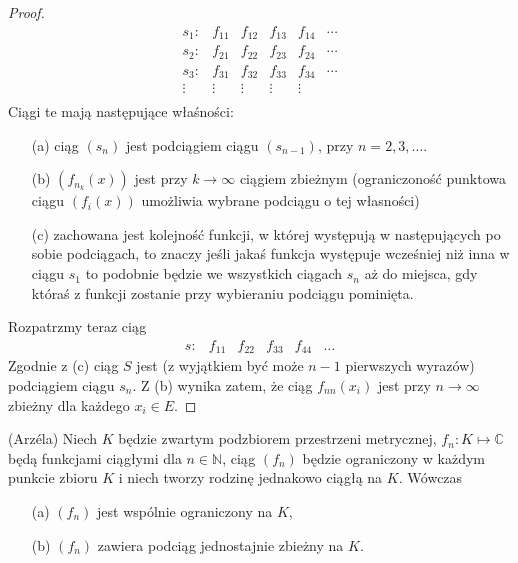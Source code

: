 \documentclass[leqno]{article}
\begin{document}
\begin{justify}
\begin{proof}
    \[
        \begin{array}{cccccc}
        s_1 : &f_{11} & f_{12} & f_{13} & f_{14} & \cdots \\
        s_2 : &f_{21} & f_{22} & f_{23} & f_{24} & \cdots \\
        s_3 : &f_{31} & f_{32} & f_{33} & f_{34} & \cdots \\
        \vdots & \vdots & \vdots & \vdots & \vdots & \\
        \end{array}
    \]
    Ciągi te mają następujące właśności:
    \begin{itemize}
        \item [(a)]
            ciąg $(s_n)$ jest podciągiem ciągu $(s_{n-1})$, przy $n = 2, 3, \ldots$.
        \item [(b)]
            $(f_{n_k}(x))$ jest przy $k \to \infty$ ciągiem zbieżnym (ograniczoność punktowa ciągu $(f_i(x))$ umożliwia wybrane podciągu o tej własności)
        \item [(c)]
            zachowana jest kolejność funkcji, w której występują w następujących po sobie podciągach, to znaczy jeśli jakaś funkcja występuje wcześniej niż inna w ciągu $s_1$
            to podobnie będzie we wszystkich ciągach $s_n$ aż do miejsca, gdy któraś z funkcji zostanie przy wybieraniu podciągu pominięta.
    \end{itemize}
    Rozpatrzmy teraz ciąg 
    \[
        \begin{array}{cccccc}
        s : &f_{11} &f_{22} &f_{33} &f_{44} &\ldots
        \end{array}
    \]
    Zgodnie z (c) ciąg $S$ jest (z wyjątkiem być może $n-1$ pierwszych wyrazów) podciągiem ciągu $s_n$. 
    Z (b) wynika zatem, że ciąg $f_{nn}(x_i)$ jest przy $n \to \infty$ zbieżny dla każdego $x_i \in E$.
\end{proof}

\begin{theorem}
{
    (Arzéla) Niech $K$ będzie zwartym podzbiorem przestrzeni metrycznej, $f_n : K \mapsto \mathbb{C}$ będą funkcjami 
    ciągłymi dla $n \in \mathbb{N}$, ciąg $(f_n)$ będzie ograniczony w każdym punkcie zbioru $K$ i niech tworzy rodzinę jednakowo ciągłą na $K$. Wówczas
    \begin{itemize}
        \item [(a)]
            $(f_n)$ jest wspólnie ograniczony na $K$,
        \item [(b)]
            $(f_n)$ zawiera podciąg jednostajnie zbieżny na $K$.
    \end{itemize}
}
\end{theorem}


\end{justify}
\end{document}
